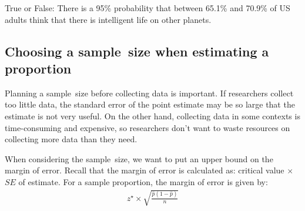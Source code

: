 \begin{exercisewrap}
\begin{nexercise}
True or False:  There is a 95\% probability that between 65.1\% and 70.9\% of US adults think that there is intelligent life on other planets.\footnotemark
\end{nexercise}
\end{exercisewrap}



\D{\newpage}

\subsection{Choosing a sample~size when estimating a proportion}
\label{moeproportion}

Planning a sample~size before collecting data is important. If researchers collect too little data, the standard error of the point estimate may be so large that the estimate is not very useful. On the other hand, collecting data in some contexts is time-consuming and expensive, so researchers don't want to waste resources on collecting more data than they need.

When considering the sample~size, we want to put an upper bound on the margin of error. Recall that the margin of error is calculated as: critical value $\times$ $SE$ of estimate.  For a sample proportion, the margin of error is given by:
\begin{align*}
z^{\star}\times \sqrt{\frac{\hat{p}(1-\hat{p})}{n}}
\end{align*}


